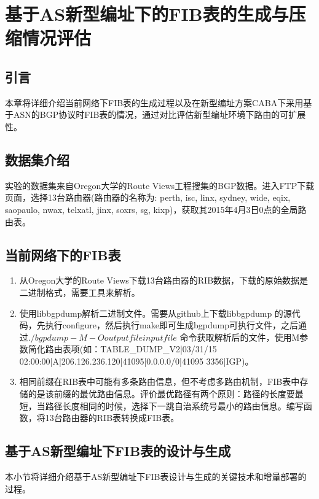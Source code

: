 

\chapter{基于AS新型编址下的FIB表的生成与压缩情况评估}
\label{dctg}
\section{引言}
本章将详细介绍当前网络下FIB表的生成过程以及在新型编址方案CABA下采用基于ASN的BGP协议时FIB表的情况，通过对比评估新型编址环境下路由的可扩展性。
\section{数据集介绍}
实验的数据集来自Oregon大学的Route Views工程搜集的BGP数据。进入FTP下载页面，选择13台路由器(路由器的名称为: perth, isc, linx, sydney, wide, eqix, saopaulo, nwax, telxatl, jinx, soxrs, sg, kixp)，获取其2015年4月3日0点的全局路由表。

\section{当前网络下的FIB表}

\begin{enumerate}
\item 从Oregon大学的Route Views下载13台路由器的RIB数据，下载的原始数据是二进制格式，需要工具来解析。
\item 使用libbgpdump解析二进制文件。需要从github上下载libbgpdump 的源代码，先执行configure，然后执行make即可生成bgpdump可执行文件，之后通过$./bgpdump -M -O outputfile inputfile$ 命令获取解析后的文件，使用M参数简化路由表项(如：TABLE\_DUMP\_V2|03/31/15 02:00:00|A|206.126.236.120|41095|0.0.0.0/0|41095 3356|IGP)。
\item 相同前缀在RIB表中可能有多条路由信息，但不考虑多路由机制，FIB表中存储的是该前缀的最优路由信息。评价最优路径有两个原则：路径的长度要最短，当路径长度相同的时候，选择下一跳自治系统号最小的路由信息。编写函数，将13台路由器的RIB表转换成FIB表。
\end{enumerate}

\section{基于AS新型编址下FIB表的设计与生成}
本小节将详细介绍基于AS新型编址下FIB表设计与生成的关键技术和增量部署的过程。
